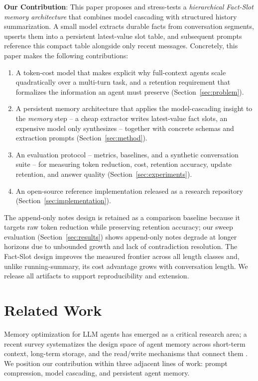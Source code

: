 \documentclass[conference]{IEEEtran}
\begin{document}
\textbf{Our Contribution}: This paper proposes and stress-tests a \textit{hierarchical Fact-Slot memory architecture} that combines model cascading with structured history summarization. A small model extracts durable facts from conversation segments, upserts them into a persistent latest-value slot table, and subsequent prompts reference this compact table alongside only recent messages. Concretely, this paper makes the following contributions:
\begin{enumerate}
    \item A token-cost model that makes explicit why full-context agents scale quadratically over a multi-turn task, and a retention requirement that formalizes the information an agent must preserve (Section~\ref{sec:problem}).
    \item A persistent memory architecture that applies the model-cascading insight to the \emph{memory} step -- a cheap extractor writes latest-value fact slots, an expensive model only synthesizes -- together with concrete schemas and extraction prompts (Section~\ref{sec:method}).
    \item An evaluation protocol -- metrics, baselines, and a synthetic conversation suite -- for measuring token reduction, cost, retention accuracy, update retention, and answer quality (Section~\ref{sec:experiments}).
    \item An open-source reference implementation released as a research repository (Section~\ref{sec:implementation}).
\end{enumerate}
The append-only notes design is retained as a comparison baseline because it targets raw token reduction while preserving retention accuracy; our sweep evaluation (Section~\ref{sec:results}) shows append-only notes degrade at longer horizons due to unbounded growth and lack of contradiction resolution. The Fact-Slot design improves the measured frontier across all length classes and, unlike running-summary, its cost advantage grows with conversation length. We release all artifacts to support reproducibility and extension.

\section{Related Work}

Memory optimization for LLM agents has emerged as a critical research area; a recent survey systematizes the design space of agent memory across short-term context, long-term storage, and the read/write mechanisms that connect them \cite{zhang2024memorysurvey}. We position our contribution within three adjacent lines of work: prompt compression, model cascading, and persistent agent memory.
\end{document}

